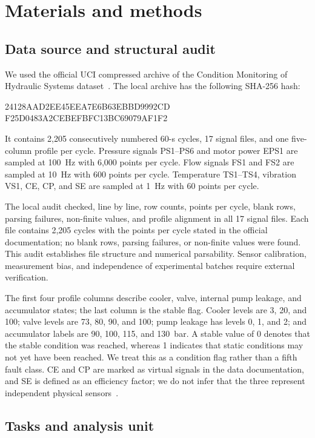 \documentclass[11pt,a4paper]{article}
\newcommand{\hashblock}{%
\begin{center}
\begingroup\ttfamily\small
24128AAD2EE45EEA7E6B63EBBD9992CD\\
F25D0483A2CEBEFBFC13BC69079AF1F2
\endgroup
\end{center}}
\begin{document}
\section{Materials and methods}

\subsection{Data source and structural audit}

We used the official UCI compressed archive of the Condition Monitoring of Hydraulic Systems dataset~\cite{uci}. The local archive has the following SHA-256 hash:\hashblock It contains 2,205 consecutively numbered 60-s cycles, 17 signal files, and one five-column profile per cycle. Pressure signals PS1--PS6 and motor power EPS1 are sampled at 100~Hz with 6,000 points per cycle. Flow signals FS1 and FS2 are sampled at 10~Hz with 600 points per cycle. Temperature TS1--TS4, vibration VS1, CE, CP, and SE are sampled at 1~Hz with 60 points per cycle.

The local audit checked, line by line, row counts, points per cycle, blank rows, parsing failures, non-finite values, and profile alignment in all 17 signal files. Each file contains 2,205 cycles with the points per cycle stated in the official documentation; no blank rows, parsing failures, or non-finite values were found. This audit establishes file structure and numerical parsability. Sensor calibration, measurement bias, and independence of experimental batches require external verification.

The first four profile columns describe cooler, valve, internal pump leakage, and accumulator states; the last column is the stable flag. Cooler levels are 3, 20, and 100; valve levels are 73, 80, 90, and 100; pump leakage has levels 0, 1, and 2; and accumulator labels are 90, 100, 115, and 130~bar. A stable value of 0 denotes that the stable condition was reached, whereas 1 indicates that static conditions may not yet have been reached. We treat this as a condition flag rather than a fifth fault class. CE and CP are marked as virtual signals in the data documentation, and SE is defined as an efficiency factor; we do not infer that the three represent independent physical sensors~\cite{uci}.

\subsection{Tasks and analysis unit}
\end{document}
